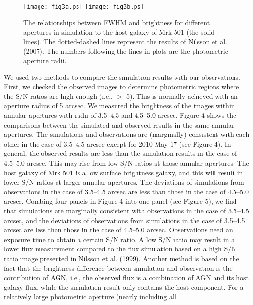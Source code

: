 \documentclass[structabstract]{raa}
\begin{document}
   \begin{figure}
  \begin{center}
   \texttt{[image: fig3a.ps]}
   \texttt{[image: fig3b.ps]}
  \end{center}
  \caption{The relationships between FWHM and brightness for different apertures in simulation to the host galaxy of Mrk 501
     (the solid lines). The dotted-dashed lines represent the results of Nilsson et al. (2007). The numbers following the lines in plots
     are the photometric aperture radii.}
  \label{fig3}
  \end{figure}

   We used two methods to compare the simulation results with our observations. First, we checked the observed images to
   determine photometric regions where the S/N ratios are high enough (i.e., $>$ 5). This is normally achieved with an aperture
   radius of 5 arcsec. We measured the brightness of the images within annular apertures with radii of 3.5--4.5 and 4.5--5.0 arcsec.
   Figure 4 shows the comparisons between the simulated and observed results in the same annular apertures. The simulations
   and observations are (marginally) consistent with each other in the case of 3.5--4.5 arcsec except for 2010 May 17 (see Figure 4).
   In general, the observed results are less than the simulation results in the case of 4.5--5.0 arcsec. This may rise from low S/N
   ratios at those annular apertures. The host galaxy of Mrk 501 is a low surface brightness galaxy, and this will result in lower
   S/N ratios at larger annular apertures. The deviations of simulations from observations in the case of 3.5--4.5 arcsec are less
   than those in the case of 4.5--5.0 arcsec. Combing four panels in Figure 4 into one panel (see Figure 5), we find that simulations
   are marginally consistent with observations in the case of 3.5--4.5 arcsec, and the deviations of observations from simulations
   in the case of 3.5--4.5 arcsec are less than those in the case of 4.5--5.0 arcsec. Observations need an exposure time to obtain a
   certain S/N ratio. A low S/N ratio may result in a lower flux measurement compared to the flux simulation based on a high S/N
   ratio image presented in Nilsson et al. (1999). Another method is based on the fact that the brightness difference between
   simulation and observation is the contribution of AGN, i.e., the observed flux is a combination of AGN and its host galaxy flux,
   while the simulation result only contains the host component. For a relatively large photometric aperture (nearly including all
\end{document}
